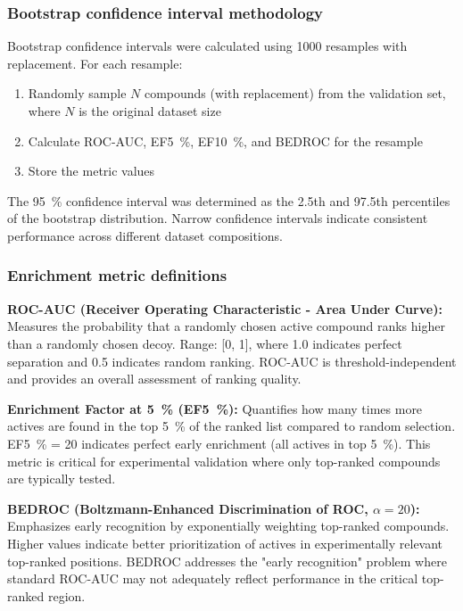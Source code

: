 \documentclass[journal=jcisd8,manuscript=suppinfo]{achemso}
\begin{document}
\subsubsection*{Bootstrap confidence interval methodology}

Bootstrap confidence intervals were calculated using \num{1000} resamples with replacement. For each resample:
\begin{enumerate}
  \item Randomly sample $N$ compounds (with replacement) from the validation set, where $N$ is the original dataset size
  \item Calculate ROC-AUC, EF\qty{5}{\percent}, EF\qty{10}{\percent}, and BEDROC for the resample
  \item Store the metric values
\end{enumerate}

The \qty{95}{\percent} confidence interval was determined as the \num{2.5}th and \num{97.5}th percentiles of the bootstrap distribution. Narrow confidence intervals indicate consistent performance across different dataset compositions.

\subsubsection*{Enrichment metric definitions}

\textbf{ROC-AUC (Receiver Operating Characteristic - Area Under Curve):}
Measures the probability that a randomly chosen active compound ranks higher than a randomly chosen decoy. Range: [\num{0}, \num{1}], where \num{1.0} indicates perfect separation and \num{0.5} indicates random ranking. ROC-AUC is threshold-independent and provides an overall assessment of ranking quality.

\textbf{Enrichment Factor at \qty{5}{\percent} (EF\qty{5}{\percent}):}
Quantifies how many times more actives are found in the top \qty{5}{\percent} of the ranked list compared to random selection. EF\qty{5}{\percent} = \num{20} indicates perfect early enrichment (all actives in top \qty{5}{\percent}). This metric is critical for experimental validation where only top-ranked compounds are typically tested.

\textbf{BEDROC (Boltzmann-Enhanced Discrimination of ROC, $\alpha = \num{20}$):}
Emphasizes early recognition by exponentially weighting top-ranked compounds. Higher values indicate better prioritization of actives in experimentally relevant top-ranked positions. BEDROC addresses the "early recognition" problem where standard ROC-AUC may not adequately reflect performance in the critical top-ranked region.
\end{document}
